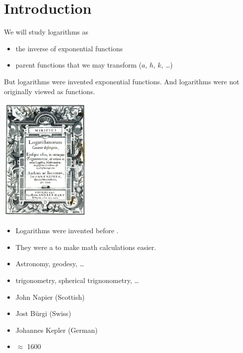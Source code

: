 \section{Introduction}

We will study logarithms as
\begin{itemize}[nosep]
    \item the inverse of exponential functions 
    \item parent functions that we may transform ($a$, $h$, $k$, \dots)
\end{itemize}

But logarithms were invented  exponential functions. 
And logarithms were not originally viewed as functions.

\begin{minipage}{0.25\textwidth}
\includegraphics[width=1.75in]{Logarithms_book_Napier}
\end{minipage}
\hfil 
\begin{minipage}{0.7\textwidth}
    \begin{itemize}[nosep]
        \item Logarithms were invented before .
        \item They were a  to make math calculations easier.
        \item Astronomy, geodesy, \dots
        \item trigonometry, spherical trignonometry, \dots
        \item John Napier (Scottish)
        \item Jost B{\"u}rgi (Swiss)
        \item Johannes Kepler (German)
        \item $\approx$ 1600
    \end{itemize}
\end{minipage}
\hfil 